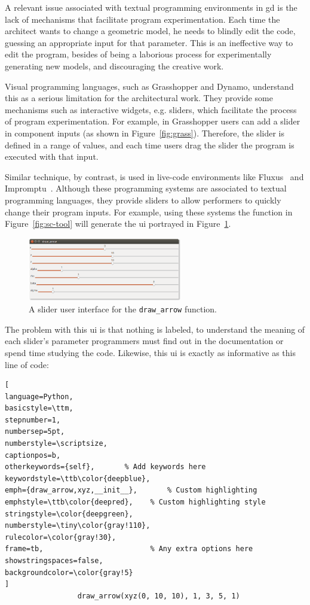 A relevant issue associated with textual programming environments in \gls{gd} is the lack of mechanisms that facilitate program experimentation. Each time the architect wants to change a geometric model, he needs to blindly edit the code, guessing an appropriate input for that parameter. This is an ineffective way to edit the program, besides of being a laborious process for experimentally generating new models, and discouraging the creative work.

Visual programming languages, such as Grasshopper and Dynamo, understand this as a serious limitation for the architectural work. They provide some mechanisms such as interactive widgets, e.g. sliders, which facilitate the process of program experimentation. For example, in Grasshopper users can add a slider in component inputs (as shown in Figure~\ref{fig:grass}). Therefore, the slider is defined in a range of values, and each time users drag the slider the program is executed with that input.

Similar technique, by contrast, is used in live-code environments like Fluxus~\citep{griffiths2007fluxus} and Impromptu~\citep{sorensen2005impromptu}. Although these programming systems are associated to textual programming languages, they provide sliders to allow performers to quickly change their program inputs. For example, using these systems the function in Figure~\ref{fig:sc-tool} will generate the \gls{ui} portrayed in Figure~\ref{fig:slider-ui}. 

\begin{figure}[h]
  \centering
  \includegraphics[width=0.6\textwidth]{images/slider-sample}
    \caption{A slider user interface for the \texttt{draw\_arrow} function.}
  \label{fig:slider-ui}
\end{figure}

The problem with this \gls{ui} is that nothing is labeled, to understand the meaning of each slider's parameter programmers must find out in the documentation or spend time studying the code. Likewise, this \gls{ui} is exactly as informative as this line of code:

\begin{lstlisting}[
language=Python,
basicstyle=\ttm,
stepnumber=1,
numbersep=5pt,                   
numberstyle=\scriptsize, 
captionpos=b, 
otherkeywords={self},       % Add keywords here
keywordstyle=\ttb\color{deepblue},
emph={draw_arrow,xyz,__init__},       % Custom highlighting
emphstyle=\ttb\color{deepred},    % Custom highlighting style
stringstyle=\color{deepgreen},
numberstyle=\tiny\color{gray!110},
rulecolor=\color{gray!30},
frame=tb,                         % Any extra options here
showstringspaces=false,
backgroundcolor=\color{gray!5} 
]
                 draw_arrow(xyz(0, 10, 10), 1, 3, 5, 1)
\end{lstlisting}

